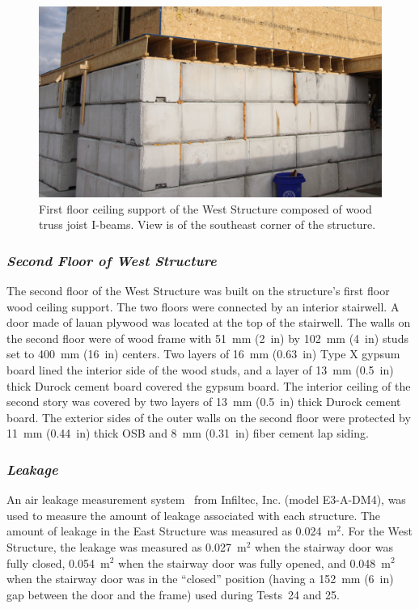 \begin{figure}[!h]
	\centering
	\includegraphics[width=6in]{Figures/Pictures/TJI_support}
	\caption[Ceiling support of the West Structure]{First floor ceiling support of the West Structure composed of wood truss joist I-beams. View is of the southeast corner of the structure.}
	\label{fig:TJI}
\end{figure}

\subsubsection*{\textit{Second Floor of West Structure}}
The second floor of the West Structure was built on the structure's first floor wood ceiling support. The two floors were connected by an interior stairwell. A door made of lauan plywood was located at the top of the stairwell. The walls on the second floor were of wood frame with 51~mm (2~in) by 102~mm (4~in) studs set to 400~mm (16~in) centers. Two layers of 16~mm (0.63~in) Type X gypsum board lined the interior side of the wood studs, and a layer of 13~mm (0.5~in) thick Durock cement board covered the gypsum board. The interior ceiling of the second story was covered by two layers of 13~mm (0.5~in) thick Durock cement board. The exterior sides of the outer walls on the second floor were protected by 11~mm (0.44~in) thick OSB and 8~mm (0.31~in) fiber cement lap siding.

\subsubsection*{\textit{Leakage}}
An air leakage measurement system~\cite{INFILTEC:leakage} from Infiltec, Inc. (model E3-A-DM4), was used to measure the amount of leakage associated with each structure. The amount of leakage in the East Structure was measured as 0.024~m$^2$. For the West Structure, the leakage was measured as 0.027~m$^2$ when the stairway door was fully closed, 0.054~m$^2$ when the stairway door was fully opened, and 0.048~m$^2$ when the stairway door was in the ``closed'' position (having a 152~mm (6~in) gap between the door and the frame) used during Tests~24 and 25.

